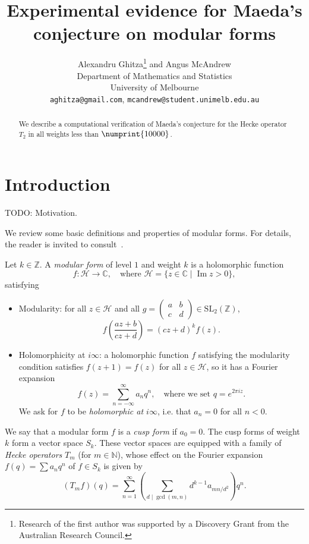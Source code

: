 \documentclass[11pt]{article}
\title{Experimental evidence for Maeda's conjecture on modular forms
}
\author{
Alexandru Ghitza\footnote{Research of the first author was supported by 
a Discovery Grant from the Australian Research Council.}  
{} and 
Angus McAndrew\\
Department of Mathematics and Statistics\\
University of Melbourne\\
{\tt aghitza@gmail.com}, {\tt mcandrew@student.unimelb.edu.au}
}
\date{}
\theoremstyle{plain}
\theoremstyle{definition}
\theoremstyle{remark}
\numberwithin{equation}{section}
\numberwithin{table}{section}
\newcommand{\longto}{\longrightarrow}
\newcommand{\CC}{\mathbb{C}}
\newcommand{\ZZ}{\mathbb{Z}}
\newcommand{\NN}{\mathbb{N}}
\newcommand{\cH}{\mathcal{H}}
\renewcommand{\Im}{\operatorname{Im}}
\newcommand{\bound}{\numprint{10000}}
\newcommand{\SL}{\mathrm{SL}}
\begin{document}
\thispagestyle{empty}

\maketitle
\begin{abstract}
  We describe a computational verification of Maeda's conjecture for the Hecke
  operator $T_2$ in all weights less than $\bound$.
\end{abstract}


\section{Introduction}

TODO: Motivation.

We review some basic definitions and properties of modular forms.  For
details, the reader is invited to consult~\cite{Stein}.

Let $k\in\ZZ$.  A \emph{modular form} of level $1$ and weight $k$ is a
holomorphic function
\begin{equation*}
  f\colon\cH\longto\CC, \quad\text{where }
  \cH=\{z\in\CC\mid \Im z>0\},
\end{equation*}
satisfying
\begin{itemize}
  \item Modularity: for all $z\in\cH$ and all
    $g=\left(\begin{smallmatrix}a&b\\c&d\end{smallmatrix}\right)\in\SL_2(\ZZ)$,
      \begin{equation*}
        f\left(\frac{az+b}{cz+d}\right)=(cz+d)^kf(z).
      \end{equation*}
  \item Holomorphicity at $i\infty$: a holomorphic function $f$ satisfying the
    modularity condition satisfies $f(z+1)=f(z)$ for all $z\in\cH$, so it has
    a Fourier expansion
    \begin{equation*}
      f(z)=\sum_{n=-\infty}^\infty a_nq^n,\quad\text{where we set }
      q=e^{2\pi i z}.
    \end{equation*}
    We ask for $f$ to be \emph{holomorphic at $i\infty$}, i.e. that $a_n=0$
    for all $n<0$.
\end{itemize}

We say that a modular form $f$ is a \emph{cusp form} if $a_0=0$.  The cusp
forms of weight $k$ form a vector space $S_k$.  These vector spaces are
equipped with a family of \emph{Hecke operators} $T_m$ (for $m\in\NN$), whose
effect on the Fourier expansion $f(q)=\sum a_nq^n$ of $f\in S_k$ is given by
\begin{equation*}
  (T_m f)(q)=\sum_{n=1}^\infty \left(\sum_{d\mid\gcd(m,n)}d^{k-1}a_{mn/d^2}\right)q^n.
\end{equation*}
\end{document}
